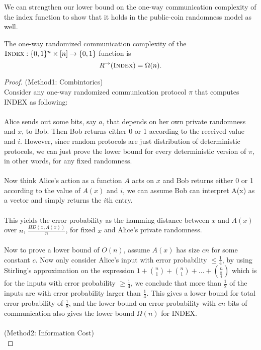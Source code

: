 We can strengthen our lower bound on the one-way communication complexity of the index function to show that it holds in the public-coin randomness model as well.

\begin{theorem}
	The one-way randomized communication complexity of the $\textsc{Index} : \{0,1\}^n \times [n] \to \{0,1\}$ function is
	\[
	R^\rightarrow(\textsc{Index}) = \Omega(n).
	\]
\end{theorem}

\begin{proof}
	(Method1: Combintorics)\\ 
	Consider any one-way randomized communication protocol $\pi$ that computes INDEX as following:\\
	\\
	Alice sends out some bits, say $a$, that depends on her own private randomness and $x$, to Bob. Then Bob returns either 0 or 1 according to the received value and $i$. However, since random protocols are just distribution of deterministic protocols, we can just prove the lower bound for every deterministic version of $\pi$, in other words, for any fixed randomness.\\
	\\
	Now think Alice's action as a function $A$ acts on $x$ and Bob returns either 0 or 1 according to the value of $A(x)$ and $i$, we can assume Bob can interpret A(x) as a vector and simply returns the $i$th entry.\\
	\\
	This yields the error probability as the hamming distance between $x$ and $A(x)$ over $n$, $\frac{HD(x,A(x))}{n}$, for fixed $x$ and Alice's private randomness. \\
	\\
	Now to prove a lower bound of $O(n)$, assume $A(x)$ has size $cn$ for some constant $c$. Now only consider Alice's input with error probability $\leq \frac14$, by using Stirling's approximation on the expression $1 + {n \choose 1} + {n \choose 1} + ... + {n \choose \frac{n}{4}}$ which is for the inputs with error probability $\ge \frac14$, we conclude that more than $\frac12$ of the inputs are with error probability larger than $\frac14$. This gives a lower bound for total error probability of $\frac18$, and the lower bound on error probability with $cn$ bits of communication also gives the lower bound $\Omega(n)$ for INDEX. \\
	\\
	(Method2: Information Cost)\\

\end{proof}
